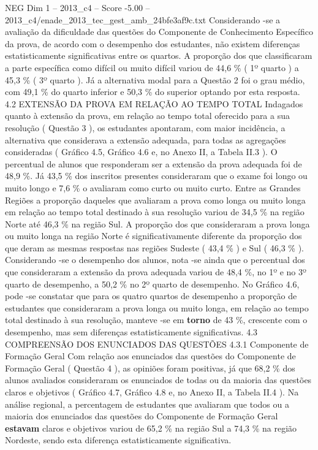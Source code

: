 \begin{textsample}{NEG Dim 1 – 2013\_c4 – Score -5.00 – 2013\_c4/enade\_2013\_tec\_gest\_amb\_24bfe3af9c.txt}
Considerando -se a avaliação da dificuldade das questões do Componente de Conhecimento Específico da prova, de acordo com o desempenho dos estudantes, não existem diferenças estatisticamente significativas entre os quartos.
A proporção dos que classificaram a parte específica como difícil ou muito difícil variou de 44,6 \% ( 1º quarto ) a 45,3 \% ( 3º quarto ).
Já a alternativa modal para a Questão 2 foi o grau médio, com 49,1 \% do quarto inferior e 50,3 \% do superior optando por esta resposta. 4.2 EXTENSÃO DA PROVA EM RELAÇÃO AO TEMPO TOTAL Indagados quanto à extensão da prova, em relação ao tempo total oferecido para a sua resolução ( Questão 3 ), os estudantes apontaram, com maior incidência, a alternativa que considerava a extensão adequada, para todas as agregações consideradas ( Gráfico 4.5, Gráfico 4.6 e, no Anexo II, a Tabela II.3 ).
O percentual de alunos que responderam ser a extensão da prova adequada foi de 48,9 \%.
Já 43,5 \% dos inscritos presentes consideraram que o exame foi longo ou muito longo e 7,6 \% o avaliaram como curto ou muito curto.
Entre as Grandes Regiões a proporção daqueles que avaliaram a prova como longa ou muito longa em relação ao tempo total destinado à sua resolução variou de 34,5 \% na região Norte até 46,3 \% na região Sul.
A proporção dos que consideraram a prova longa ou muito longa na região Norte é significativamente diferente da proporção dos que deram as mesmas respostas nas regiões Sudeste ( 43,4 \% ) e Sul ( 46,3 \% ).
Considerando -se o desempenho dos alunos, nota -se ainda que o percentual dos que consideraram a extensão da prova adequada variou de 48,4 \%, no 1º e no 3º quarto de desempenho, a 50,2 \% no 2º quarto de desempenho.
No Gráfico 4.6, pode -se constatar que para os quatro quartos de desempenho a proporção de estudantes que consideraram a prova longa ou muito longa, em relação ao tempo total destinado à sua resolução, manteve -se em \textbf{torno} de 43 \%, crescente com o desempenho, mas sem diferenças estatisticamente significativas. 4.3 COMPREENSÃO DOS ENUNCIADOS DAS QUESTÕES 4.3.1 Componente de Formação Geral Com relação aos enunciados das questões do Componente de Formação Geral ( Questão 4 ), as opiniões foram positivas, já que 68,2 \% dos alunos avaliados consideraram os enunciados de todas ou da maioria das questões claros e objetivos ( Gráfico 4.7, Gráfico 4.8 e, no Anexo II, a Tabela II.4 ).
Na análise regional, a percentagem de estudantes que avaliaram que todos ou a maioria dos enunciados das questões do Componente de Formação Geral \textbf{estavam} claros e objetivos variou de 65,2 \% na região Sul a 74,3 \% na região Nordeste, sendo esta diferença estatisticamente significativa.

\end{textsample}
